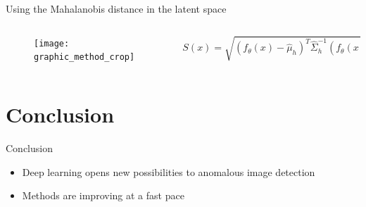 \documentclass[xcolor=pdftex,dvipsnames,table,mathserif,aspectratio=169]{beamer}
\begin{document}
\begin{frame}{Using the Mahalanobis distance in the latent space}

\begin{columns}
  \begin{column}{.5\textwidth}
  \begin{figure}[ht]
    \centering
    \texttt{[image: graphic\_method\_crop]}
  \end{figure}

  \end{column}

  \begin{column}{.5\textwidth}
    \[S(x) = \sqrt{(f_{\theta}(x)-\hat{\mu}_h)^{T}\hat{\Sigma}^{-1}_{h} (f_{\theta}(x)-\hat{\mu}_h)}\]
  \end{column}
\end{columns}


\end{frame}



\section{Conclusion}

\begin{frame}{Conclusion}

\begin{itemize}
\item Deep learning opens new possibilities to anomalous image detection
\item Methods are improving at a fast pace
\end{itemize}

\end{frame}



\end{document}
